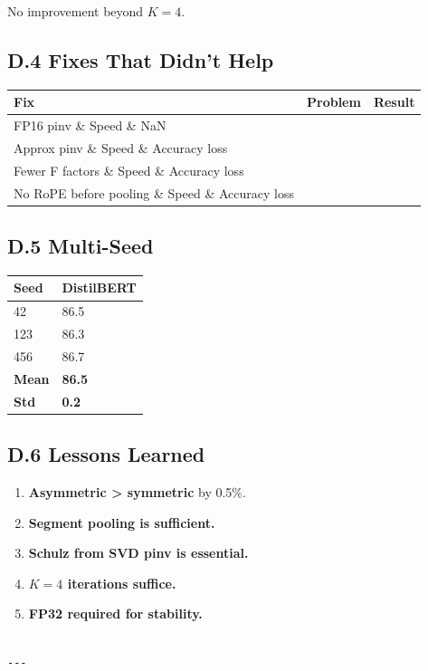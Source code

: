 No improvement beyond $K = 4$.

\subsection{D.4 Fixes That Didn't Help}

\begin{table}[H]
\centering
\small
\begin{tabular}{lll}
\toprule
\textbf{Fix} & \textbf{Problem} & \textbf{Result} \\
\midrule
FP16 pinv \& Speed \& NaN \\
Approx pinv \& Speed \& Accuracy loss \\
Fewer F factors \& Speed \& Accuracy loss \\
No RoPE before pooling \& Speed \& Accuracy loss \\
\bottomrule
\end{tabular}
\end{table}

\subsection{D.5 Multi-Seed}

\begin{table}[H]
\centering
\small
\begin{tabular}{ll}
\toprule
\textbf{Seed} & \textbf{DistilBERT} \\
\midrule
42 & 86.5 \\
123 & 86.3 \\
456 & 86.7 \\
\textbf{Mean} & \textbf{86.5} \\
\textbf{Std} & \textbf{0.2} \\
\bottomrule
\end{tabular}
\end{table}

\subsection{D.6 Lessons Learned}

\begin{enumerate}
\item \textbf{Asymmetric > symmetric} by 0.5\%.
\item \textbf{Segment pooling is sufficient.}
\item \textbf{Schulz from SVD pinv is essential.}
\item \textbf{$K = 4$ iterations suffice.}
\item \textbf{FP32 required for stability.}
\end{enumerate}
\begin{lstlisting}

---
\end{lstlisting}